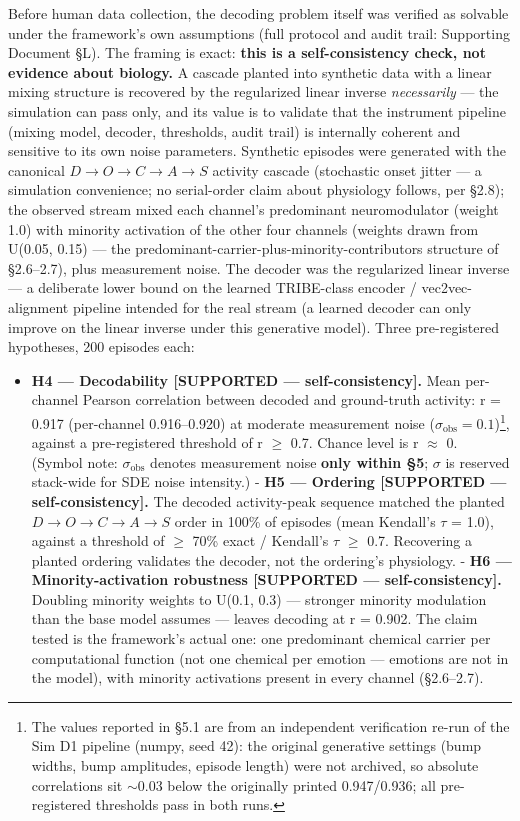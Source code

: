 \documentclass[
]{article}
\providecommand{\tightlist}{%
  \setlength{\itemsep}{0pt}\setlength{\parskip}{0pt}}
\begin{document}
Before human data collection, the decoding problem itself was verified
as solvable under the framework's own assumptions (full protocol and
audit trail: Supporting Document §L). The framing is exact: \textbf{this
is a self-consistency check, not evidence about biology.} A cascade
planted into synthetic data with a linear mixing structure is recovered
by the regularized linear inverse \emph{necessarily} --- the simulation
can pass only, and its value is to validate that the instrument pipeline
(mixing model, decoder, thresholds, audit trail) is internally coherent
and sensitive to its own noise parameters. Synthetic episodes were
generated with the canonical \(D \to O \to C \to A \to S\) activity
cascade (stochastic onset jitter --- a simulation convenience; no
serial-order claim about physiology follows, per §2.8); the observed
stream mixed each channel's predominant neuromodulator (weight 1.0) with
minority activation of the other four channels (weights drawn from
U(0.05, 0.15) --- the predominant-carrier-plus-minority-contributors
structure of §2.6--2.7), plus measurement noise. The decoder was the
regularized linear inverse --- a deliberate lower bound on the learned
TRIBE-class encoder / vec2vec-alignment pipeline intended for the real
stream (a learned decoder can only improve on the linear inverse under
this generative model). Three pre-registered hypotheses, 200 episodes
each:

\begin{itemize}
\tightlist
\item
  \textbf{H4 --- Decodability {[}SUPPORTED --- self-consistency{]}.}
  Mean per-channel Pearson correlation between decoded and ground-truth
  activity: r = 0.917 (per-channel 0.916--0.920) at moderate measurement
  noise (\(\sigma_{\mathrm{obs}} = 0.1\))\footnote{The values reported
    in §5.1 are from an independent verification re-run of the Sim D1
    pipeline (numpy, seed 42): the original generative settings (bump
    widths, bump amplitudes, episode length) were not archived, so
    absolute correlations sit \({\sim}0.03\) below the originally
    printed 0.947/0.936; all pre-registered thresholds pass in both
    runs.}, against a pre-registered threshold of r \(\geq\) 0.7. Chance
  level is r \(\approx\) 0. (Symbol note: \(\sigma_{\mathrm{obs}}\)
  denotes measurement noise \textbf{only within §5}; \(\sigma\) is
  reserved stack-wide for SDE noise intensity.) - \textbf{H5 ---
  Ordering {[}SUPPORTED --- self-consistency{]}.} The decoded
  activity-peak sequence matched the planted
  \(D \to O \to C \to A \to S\) order in 100\% of episodes (mean
  Kendall's \(\tau\) = 1.0), against a threshold of \(\geq\) 70\% exact
  / Kendall's \(\tau\) \(\geq\) 0.7. Recovering a planted ordering
  validates the decoder, not the ordering's physiology. - \textbf{H6 ---
  Minority-activation robustness {[}SUPPORTED --- self-consistency{]}.}
  Doubling minority weights to U(0.1, 0.3) --- stronger minority
  modulation than the base model assumes --- leaves decoding at r =
  0.902. The claim tested is the framework's actual one: one predominant
  chemical carrier per computational function (not one chemical per
  emotion --- emotions are not in the model), with minority activations
  present in every channel (§2.6--2.7).
\end{itemize}
\end{document}

